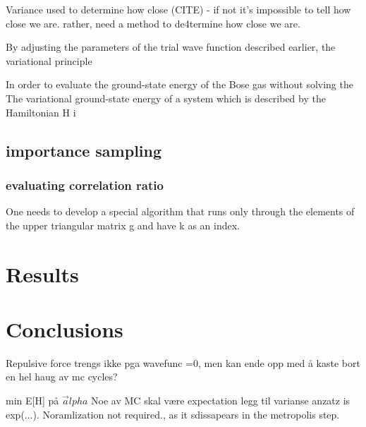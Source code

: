 \documentclass[%
oneside,                 %
final,                   %
10pt]{article}
\begin{document}
Variance used to determine how close (CITE) - if not it's impossible to tell how close we are. rather, need a method to de4termine how close we are.


By adjusting the parameters of the trial wave function described earlier, the variational principle 


In order to evaluate the ground-state energy of the Bose gas without solving the 
The variational  ground-state energy of a system which is described by the Hamiltonian H i
 
\subsection{importance sampling} \label{importance_sampling}

\subsubsection{evaluating correlation ratio}


 
 
 
One needs to develop a special algorithm that runs only through the elements of the upper triangular matrix g and have k as an index. 
\section{Results} \label{results}

\section{Conclusions} \label{conclusions}
Repulsive force trengs ikke pga wavefunc =0, men kan ende opp med å kaste bort en hel haug av mc cycles?

min E[H] på $\vec alpha$
Noe av MC skal være expectation
legg til varianse
anzatz is exp(...). Noramlization not required., as it sdissapears in the metropolis step.
 \label{refer}

\end{document}
